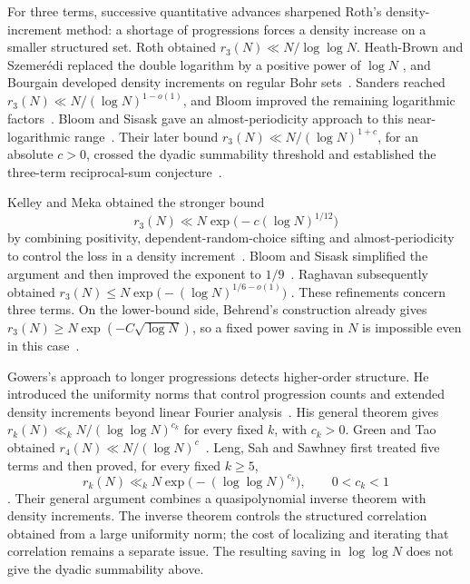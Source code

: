 For three terms, successive quantitative advances sharpened Roth's
density-increment method: a shortage of progressions forces a density
increase on a smaller structured set. Roth obtained
$r_3(N)\ll N/\log\log N$. Heath-Brown and Szemer\'edi replaced
the double logarithm by a positive power of $\log N$
\cite{HeathBrown1987,Szemeredi1990}, and Bourgain developed
density increments on regular Bohr sets~\cite{Bourgain1999,Bourgain2008}.
Sanders reached $r_3(N)\ll N/(\log N)^{1-o(1)}$, and Bloom
improved the remaining logarithmic factors~\cite{Sanders2011,Bloom2016}.
Bloom and Sisask gave an almost-periodicity approach to this
near-logarithmic range~\cite{BloomSisask2019}. Their later bound
$r_3(N)\ll N/(\log N)^{1+c}$, for an absolute $c>0$,
crossed the dyadic summability threshold and established the
three-term reciprocal-sum conjecture~\cite{BloomSisask2020}.

Kelley and Meka obtained the stronger bound
\[
             r_3(N)\ll N\exp\bigl(-c(\log N)^{1/12}\bigr)
\]
by combining positivity, dependent-random-choice sifting and
almost-periodicity to control the loss in a density
increment~\cite{KelleyMeka2023}. Bloom and Sisask simplified the
argument and then improved the exponent to
$1/9$~\cite{BloomSisaskKelleyMeka,BloomSisaskImprovement2023}.
Raghavan subsequently obtained
$r_3(N)\le N\exp\bigl(-(\log N)^{1/6-o(1)}\bigr)$
\cite[Theorem~1.4]{Raghavan2026}. These refinements concern three
terms. On the lower-bound side, Behrend's construction already gives
$r_3(N)\ge N\exp(-C\sqrt{\log N})$, so a fixed power saving
in $N$ is impossible even in this case~\cite{Behrend1946}.

Gowers's approach to longer progressions detects higher-order
structure. He introduced the uniformity norms that control
progression counts and extended density increments beyond linear
Fourier analysis~\cite{Gowers1998,Gowers2001}. His general theorem
gives $r_k(N)\ll_k N/(\log\log N)^{c_k}$ for every fixed $k$,
with $c_k>0$. Green and Tao obtained
$r_4(N)\ll N/(\log N)^c$~\cite{GreenTao2017}.
Leng, Sah and Sawhney first treated five terms and then proved,
for every fixed $k\ge5$,
\[
 r_k(N)\ll_k N\exp\bigl(-(\log\log N)^{c_k}\bigr),
 \qquad 0<c_k<1
\]
\cite{LengSahSawhneyFive,LSSSzemeredi2024}.
Their general argument combines a quasipolynomial inverse theorem
with density increments. The inverse theorem controls the structured
correlation obtained from a large uniformity norm; the cost of
localizing and iterating that correlation remains a separate issue.
The resulting saving in $\log\log N$ does not give the dyadic
summability above.

